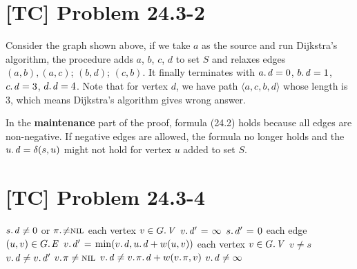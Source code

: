 \documentclass[a4paper,11pt,twocolumn]{article}
\newcommand{\NIL}{\const{nil}}
\newcommand{\FALSE}{\const{false}}
\newcommand{\TRUE}{\const{true}}
\begin{document}
  \section{[TC] Problem 24.3-2}
  \small
  \begin{center}
   \par
  \end{center}
  \normalsize
  Consider the graph shown above, if we take $a$ as the source and run Dijkstra's algorithm, the procedure adds $a$, $b$, $c$, $d$ to set $S$ and relaxes edges $(a, b), (a, c)$; $(b, d)$; $(c, b)$. It finally terminates with $\attrib{a}{d} = 0$, $\attrib{b}{d} = 1$, $\attrib{c}{d} = 3$, $\attrib{d}{d} = 4$. Note that for vertex $d$, we have path $\langle a, c, b, d \rangle$ whose length is 3, which means Dijkstra's algorithm gives wrong answer. \par
  In the \textbf{maintenance} part of the proof, formula (24.2) holds because all edges are non-negative. If negative edges are allowed, the formula no longer holds and the $\attrib{u}{d} = \delta(s, u)$ might not hold for vertex $u$ added to set $S$.

  \section{[TC] Problem 24.3-4}
  \begin{codebox}
  \li \If $\attrib{s}{d} \neq 0$ or $\attrib{\pi} \neq \NIL$
  \li \Do \Return \FALSE
      \End
  \li \For each vertex $v \in \attrib{G}{V}$
  \li \Do  $\attrib{v}{d'} \gets \infty$
      \End
  \li $\attrib{s}{d'} \gets 0$
  \li \For each edge $(u, v) \in \attrib{G}{E}$
  \li \Do  $\attrib{v}{d'} \gets \min(\attrib{v}{d}, \attrib{u}{d} + w(u, v))$
      \End
  \li \For each vertex $v \in \attrib{G}{V}$
  \li \Do \If $v \neq s$
  \li     \Do \If $\attrib{v}{d} \neq \attrib{v}{d'}$
  \li         \Do \Return \FALSE
              \End
  \li     \If $\attrib{v}{\pi} \neq \NIL$
  \li         \Do \If $\attrib{v}{d} \neq \attribb{v}{\pi}{d} + w(\attrib{v}{\pi}, v)$
  \li             \Do \Return \FALSE
                  \End
  \li         \ElseIf $\attrib{v}{d} \neq \infty$
  \li         \Do \Return \FALSE
              \End
          \End
      \End
  \li \Return \TRUE
  \end{codebox}
\end{document}
